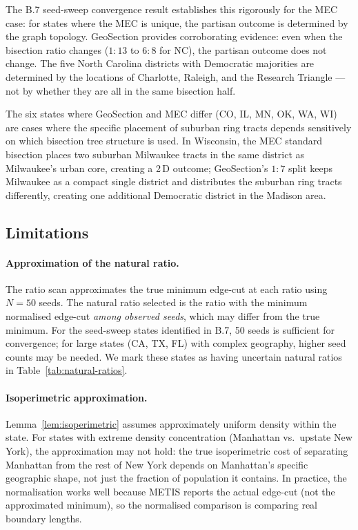 The B.7 seed-sweep convergence result establishes this rigorously for
the MEC case: for states where the MEC is unique, the partisan outcome
is determined by the graph topology.
GeoSection provides corroborating evidence: even when the bisection ratio
changes ($1:13$ to $6:8$ for NC), the partisan outcome does not change.
The five North Carolina districts with Democratic majorities are determined
by the locations of Charlotte, Raleigh, and the Research Triangle ---
not by whether they are all in the same bisection half.

The six states where GeoSection and MEC differ (CO, IL, MN, OK, WA, WI)
are cases where the specific placement of suburban ring tracts depends
sensitively on which bisection tree structure is used.
In Wisconsin, the MEC standard bisection places two suburban Milwaukee
tracts in the same district as Milwaukee's urban core, creating a 2\,D
outcome; GeoSection's $1:7$ split keeps Milwaukee as a compact single
district and distributes the suburban ring tracts differently, creating
one additional Democratic district in the Madison area.

\subsection{Limitations}
\label{sec:limitations}

\paragraph{Approximation of the natural ratio.}
The ratio scan approximates the true minimum edge-cut at each ratio using
$N=50$ seeds.
The natural ratio selected is the ratio with the minimum normalised edge-cut
\emph{among observed seeds}, which may differ from the true minimum.
For the seed-sweep states identified in B.7, 50 seeds is sufficient for
convergence; for large states (CA, TX, FL) with complex geography, higher
seed counts may be needed.
We mark these states as having uncertain natural ratios in Table~\ref{tab:natural-ratios}.

\paragraph{Isoperimetric approximation.}
Lemma~\ref{lem:isoperimetric} assumes approximately uniform density within
the state.
For states with extreme density concentration (Manhattan vs.\ upstate New York),
the approximation may not hold: the true isoperimetric cost of separating
Manhattan from the rest of New York depends on Manhattan's specific geographic
shape, not just the fraction of population it contains.
In practice, the normalisation works well because METIS reports the actual
edge-cut (not the approximated minimum), so the normalised comparison is
comparing real boundary lengths.

